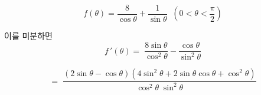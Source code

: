 \[ 
    f(\theta) = 
    \dfrac 8 {\cos \theta} 
    +
    \dfrac 1 {\sin \theta}
    \;\; 
    \left( 0 < \theta < \dfrac {\pi} 2 \right)
\] 

이를 미분하면
\[
f \,\prime(\theta) = \; 
\dfrac {8 \sin \theta}{\cos^2 \theta} 
-
\dfrac {\cos \theta} {\sin^2 \theta} 
\]

\[ 
= \;
\dfrac 
{(2\sin\theta - \cos \theta )
( 4\sin^2\theta + 2\sin\theta\cos\theta + \cos^2\theta    )}
{\cos^2 \theta \; \sin^2 \theta} 
\]

